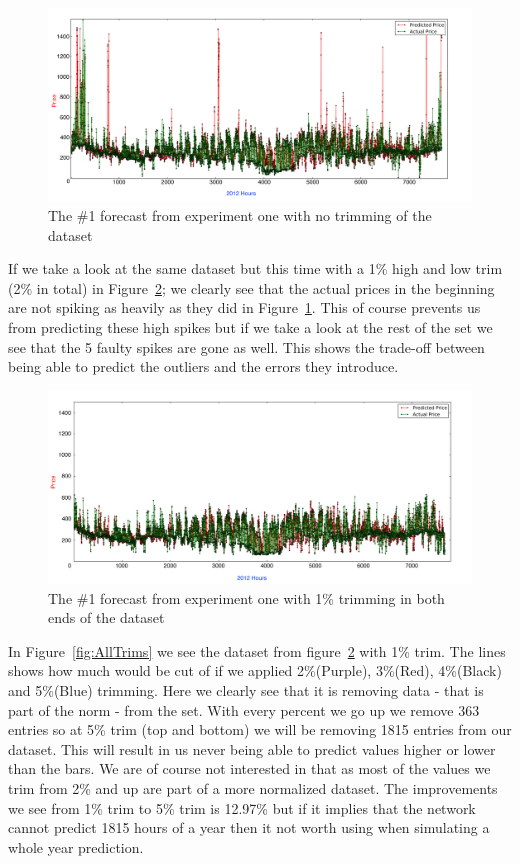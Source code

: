 \begin{figure}[H]
\centering
\includegraphics[width=\linewidth]{billeder/PriceExperimentalAnalysis/NoTrimming.png}
\caption{The \#1 forecast from experiment one with no trimming of the dataset}
\label{fig:NoTrim}
\end{figure}

If we take a look at the same dataset but this time with a 1\% high and low trim (2\% in total) in Figure~\ref{fig:1PTrim}; we clearly see that the actual prices in the beginning are not spiking as heavily as they did in Figure~\ref{fig:NoTrim}. This of course prevents us from predicting these high spikes but if we take a look at the rest of the set we see that the 5 faulty spikes are gone as well. This shows the trade-off between being able to predict the outliers and the errors they introduce.

\begin{figure}[H]
\centering
\includegraphics[width=\linewidth]{billeder/PriceExperimentalAnalysis/1PTrim.png}
\caption{The \#1 forecast from experiment one with 1\% trimming in both ends of the dataset}
\label{fig:1PTrim}
\end{figure}

In Figure~\ref{fig:AllTrims} we see the dataset from figure~\ref{fig:1PTrim} with 1\% trim. The lines shows how much would be cut of if we applied 2\%(Purple), 3\%(Red), 4\%(Black) and 5\%(Blue) trimming. Here we clearly see that it is removing data - that is part of the norm - from the set. With every percent we go up we remove 363 entries so at 5\% trim (top and bottom) we will be removing 1815 entries from our dataset. This will result in us never being able to predict values higher or lower than the bars. We are of course not interested in that as most of the values we trim from 2\% and up are part of a more normalized dataset. The improvements we see from 1\% trim to 5\% trim is 12.97\% but if it implies that the network cannot predict 1815 hours of a year then it not worth using when simulating a whole year prediction.

